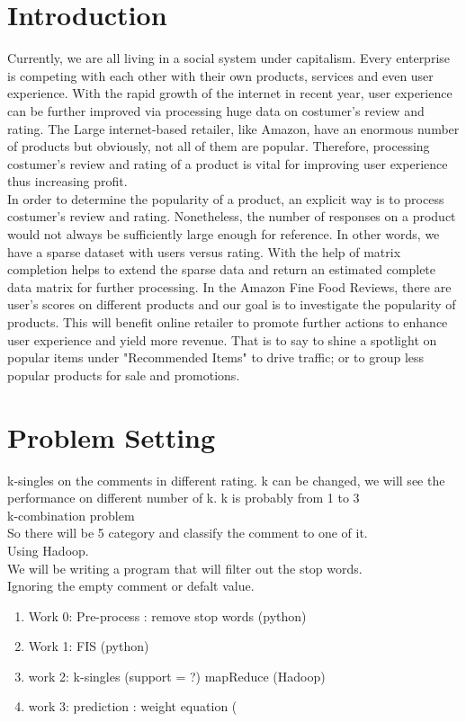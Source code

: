 \section{Introduction}
Currently, we are all living in a social system under capitalism. Every enterprise is competing with each other with their own products, services and even user experience. With the rapid growth of the internet in recent year, user experience can be further improved via processing huge data on costumer's review and rating. The Large internet-based retailer, like Amazon, have an enormous number of products but obviously, not all of them are popular. Therefore, processing costumer's review and rating of a product is vital for improving user experience thus increasing profit.\\

In order to determine the popularity of a product, an explicit way is to process costumer's review and rating. Nonetheless, the number of responses on a product would not always be sufficiently large enough for reference. In other words, we have a sparse dataset with users versus rating. With the help of matrix completion helps to extend the sparse data and return an estimated complete data matrix for further processing. In the Amazon Fine Food Reviews, there are user's scores on different products and our goal is to investigate the popularity of products. This will benefit online retailer to promote further actions to enhance user experience and yield more revenue. That is to say to shine a spotlight on popular items under "Recommended Items" to drive traffic; or to group less popular products for sale and promotions.


\section{Problem Setting}
k-singles on the comments in different rating. k can be changed, we will see the performance on different number of k. k is probably from 1 to 3\\
k-combination problem\\
So there will be 5 category and classify the comment to one of it.\\
Using Hadoop.\\
We will be writing a program that will filter out the stop words.\\
Ignoring the empty comment or defalt value.\\

\begin{enumerate}
\item Work 0: Pre-process : remove stop words (python)
\item Work 1: FIS (python)
\item work 2: k-singles (support = ?) mapReduce (Hadoop)
\item work 3: prediction : weight equation (
\end{enumerate}

